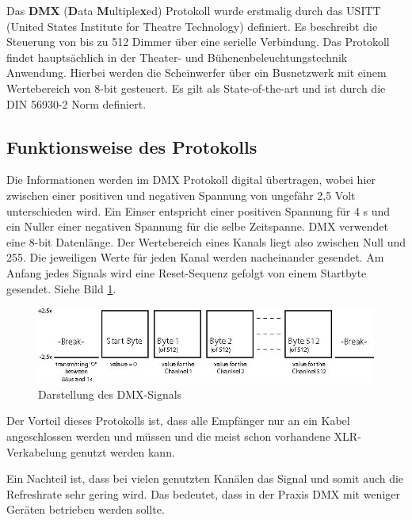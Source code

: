 Das \textbf{DMX} (\textbf{D}ata \textbf{M}ultiple\textbf{x}ed) Protokoll
wurde erstmalig durch das USITT (United States Institute for Theatre
Technology) definiert. Es beschreibt die Steuerung von bis zu 512 Dimmer
über eine serielle Verbindung. Das Protokoll findet hauptsächlich in der
Theater- und Bühenenbeleuchtungstechnik Anwendung. Hierbei werden die
Scheinwerfer über ein Busnetzwerk mit einem Wertebereich von 8-bit
gesteuert. Es gilt als State-of-the-art und ist durch die DIN 56930-2
Norm definiert.\cite{dmx512/1990}

\hypertarget{funktionsweise-des-protokolls}{%
\subsection{Funktionsweise des
Protokolls}\label{funktionsweise-des-protokolls}}

Die Informationen werden im DMX Protokoll digital übertragen, wobei hier
zwischen einer positiven und negativen Spannung von ungefähr 2,5 Volt
unterschieden wird. Ein Einser entspricht einer positiven Spannung für 4
\textmu s und ein Nuller einer negativen Spannung für die selbe
Zeitspanne. DMX verwendet eine 8-bit Datenlänge. Der Wertebereich eines
Kanals liegt also zwischen Null und 255. Die jeweiligen Werte für jeden
Kanal werden nacheinander gesendet. Am Anfang jedes Signals wird eine
Reset-Sequenz gefolgt von einem Startbyte gesendet.\cite{dmx-1} Siehe
Bild \ref{dmx-signal}.

\begin{figure}
\centering
\includegraphics{bilder/Clemens/dmx.jpg}
\caption{Darstellung des DMX-Signals\label{dmx-signal}}
\end{figure}

Der Vorteil dieses Protokolls ist, dass alle Empfänger nur an ein Kabel
angeschlossen werden und müssen und die meist schon vorhandene
XLR-Verkabelung genutzt werden kann.\cite{dmx512/1990}

Ein Nachteil ist, dass bei vielen genutzten Kanälen das Signal und somit
auch die Refreshrate sehr gering wird. Das bedeutet, dass in der Praxis
DMX mit weniger Geräten betrieben werden sollte.\cite{dmx512/1990}


